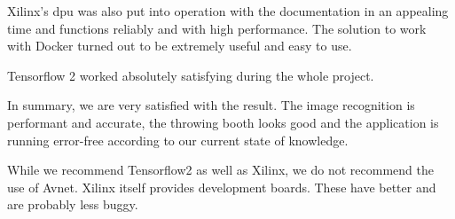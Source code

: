 Xilinx's \acrshort{dpu} was also put into operation with the documentation in an appealing time and functions reliably and with high performance.
The solution to work with Docker turned out to be extremely useful and easy to use.

Tensorflow 2 worked absolutely satisfying during the whole project. 

In summary, we are very satisfied with the result. 
The image recognition is performant and accurate, the throwing booth looks good and the application is running error-free according to our current state of knowledge.

While we recommend Tensorflow2 as well as Xilinx, we do not recommend the use of Avnet.
Xilinx itself provides development boards.
These have better  and are probably less buggy.






